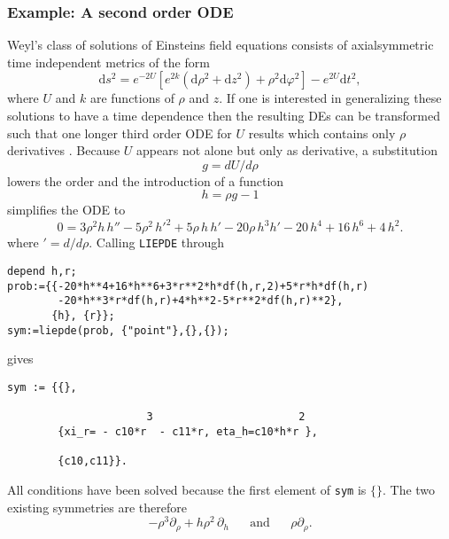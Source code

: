 \subsubsection{Example: A second order ODE}
Weyl's class of solutions of Einsteins field equations consists of
axialsymmetric time independent metrics of the form
\begin{equation}
{\mathrm{d}} s^2 = e^{-2 U} \left[ e^{2 k}  \left( \mathrm{d} \rho^2 + \mathrm{d}
z^2 \right)+\rho^2 \mathrm{d} \varphi^2 \right] - e^{2 U} \mathrm{d} t^2,
\end{equation}
where $U$ and $k$ are functions of $\rho$ and $z$. If one is interested in
generalizing these solutions to have a time dependence then the resulting
DEs can be transformed such that one longer third order ODE for $U$ results
which contains only $\rho$ derivatives \cite{Markus}. Because $U$ appears
not alone but only as derivative, a substitution
\begin{equation}
g = dU/d\rho      \label{g1dgl}
\end{equation}
lowers the order and the introduction of a function
\begin{equation}
h = \rho g - 1    \label{g2dgl}
\end{equation}
simplifies the ODE to
\begin{equation}
0 = 3\rho^2h\,h''
-5\rho^2\,h'^2+5\rho\,h\,h'-20\rho\,h^3h'-20\,h^4+16\,h^6+4\,h^2. \label{hdgl}
\end{equation}
where $'= d/d\rho$.
Calling \texttt{LIEPDE} through
{\small \begin{verbatim}
depend h,r;
prob:={{-20*h**4+16*h**6+3*r**2*h*df(h,r,2)+5*r*h*df(h,r)
        -20*h**3*r*df(h,r)+4*h**2-5*r**2*df(h,r)**2},
       {h}, {r}};
sym:=liepde(prob, {"point"},{},{});
\end{verbatim}}
gives {\small \begin{verbatim}
sym := {{},

                      3                       2
        {xi_r= - c10*r  - c11*r, eta_h=c10*h*r },

        {c10,c11}}.
\end{verbatim}}
All conditions have been solved because the first element of \texttt{sym}
is $\{\}$. The two existing symmetries are therefore
\begin{equation}
  - \rho^3 \partial_{\rho} +  h \rho^2 \,\partial_{h} \;\;\;\;\;\;\mbox{and}
  \;\;\;\;\;\;\rho \partial_{\rho}.
\end{equation}

